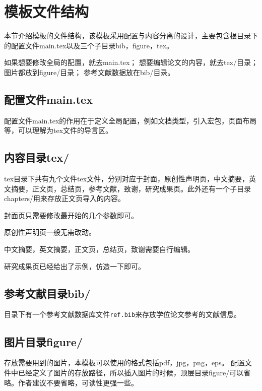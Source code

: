 \section{模板文件结构}

本节介绍模板的文件结构，该模板采用配置与内容分离的设计，主要包含根目录下的配置文件main.tex以及三个子目录bib，figure，tex。

如果想要修改全局的配置，就去main.tex；
想要编辑论文的内容，就去tex/目录；
图片都放到figure/目录；
参考文献数据放在bib/目录。

\subsection{配置文件main.tex}

配置文件main.tex的作用在于定义全局配置，例如文档类型，引入宏包，页面布局等，可以理解为tex文件的导言区。

\subsection{内容目录tex/}

tex目录下共有九个文件tex文件，分别对应于封面，原创性声明页，中文摘要，英文摘要，正文页，总结页，参考文献，致谢，研究成果页。此外还有一个子目录chapters/用来存放正文页导入的内容。

封面页只需要修改最开始的几个参数即可。

原创性声明页一般无需改动。

中文摘要，英文摘要，正文页，总结页，致谢需要自行编辑。

研究成果页已经给出了示例，仿造一下即可。

\subsection{参考文献目录bib/}

目录下有一个参考文献数据库文件\verb|ref.bib|来存放学位论文参考的文献信息。

\subsection{图片目录figure/}

存放需要用到的图片，本模板可以使用的格式包括pdf，jpg，png，eps。
配置文件中已经定义了图片的存放路径，所以插入图片的时候，顶层目录figure/可以省略。作者建议不要省略，可读性更强一些。
